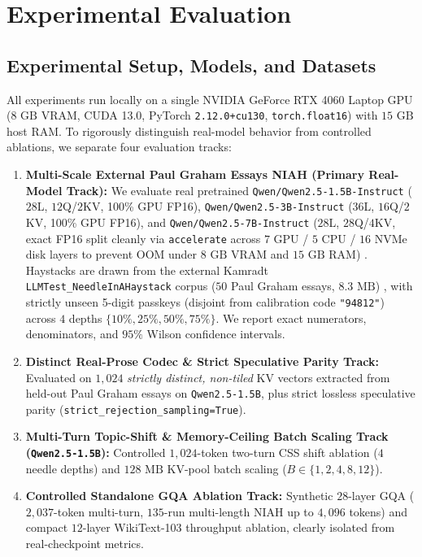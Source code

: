 \documentclass[conference]{IEEEtran}
\begin{document}
\section{Experimental Evaluation}

\subsection{Experimental Setup, Models, and Datasets}
All experiments run locally on a single NVIDIA GeForce RTX 4060 Laptop GPU ($8\text{ GB}$ VRAM, CUDA 13.0, PyTorch \texttt{2.12.0+cu130}, \texttt{torch.float16}) with $15\text{ GB}$ host RAM. To rigorously distinguish real-model behavior from controlled ablations, we separate four evaluation tracks:
\begin{enumerate}
    \item \textbf{Multi-Scale External Paul Graham Essays NIAH (Primary Real-Model Track):} We evaluate real pretrained \texttt{Qwen/Qwen2.5-1.5B-Instruct} ($28$L, $12$Q/$2$KV, 100\% GPU FP16), \texttt{Qwen/Qwen2.5-3B-Instruct} ($36$L, $16$Q/$2$KV, 100\% GPU FP16), and \texttt{Qwen/Qwen2.5-7B-Instruct} ($28$L, $28$Q/$4$KV, exact FP16 split cleanly via \texttt{accelerate} across $7$ GPU / $5$ CPU / $16$ NVMe disk layers to prevent OOM under $8\text{ GB}$ VRAM and $15\text{ GB}$ RAM) \cite{b11}. Haystacks are drawn from the external Kamradt \texttt{LLMTest\_NeedleInAHaystack} corpus ($50$ Paul Graham essays, $8.3\text{ MB}$) \cite{b15}, with strictly unseen 5-digit passkeys (disjoint from calibration code \texttt{"94812"}) across $4$ depths $\{10\%, 25\%, 50\%, 75\%\}$. We report exact numerators, denominators, and $95\%$ Wilson confidence intervals.
    \item \textbf{Distinct Real-Prose Codec \& Strict Speculative Parity Track:} Evaluated on $1{,}024$ \emph{strictly distinct, non-tiled} KV vectors extracted from held-out Paul Graham essays on \texttt{Qwen2.5-1.5B}, plus strict lossless speculative parity (\texttt{strict\_rejection\_sampling=True}).
    \item \textbf{Multi-Turn Topic-Shift \& Memory-Ceiling Batch Scaling Track (\texttt{Qwen2.5-1.5B}):} Controlled $1{,}024$-token two-turn CSS shift ablation ($4$ needle depths) and $128\text{ MB}$ KV-pool batch scaling ($B \in \{1, 2, 4, 8, 12\}$).
    \item \textbf{Controlled Standalone GQA Ablation Track:} Synthetic $28$-layer GQA ($2{,}037$-token multi-turn, $135$-run multi-length NIAH up to $4{,}096$ tokens) and compact $12$-layer WikiText-103 \cite{b16} throughput ablation, clearly isolated from real-checkpoint metrics.
\end{enumerate}
\end{document}
